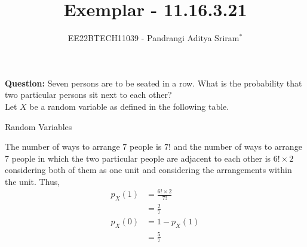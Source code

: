 \documentclass[journal,12pt,twocolumn]{IEEEtran}
\theoremstyle{remark}
\begin{document}

\vspace{3cm}

\title{Exemplar - 11.16.3.21}
\author{EE22BTECH11039 - Pandrangi Aditya Sriram$^{*}$%
}
\maketitle
\newpage
\bigskip

\renewcommand{\thefigure}{\theenumi}
\renewcommand{\thetable}{\theenumi}


\vspace{3cm}
\textbf{Question:} Seven persons are to be seated in a row. What is the probability that two particular persons sit next to each other?\\

\solution
Let $X$ be a random variable as defined in the following table. 
\begin{table}[!ht]
    \centering
    
    \caption{Random Variables}
    \label{table:11_16_3_21}
\end{table}
The number of ways to arrange 7 people is $7!$ and the number of ways to arrange 7 people in which the two particular people are adjacent to each other is $6! \times 2$ considering both of them as one unit and considering the arrangements within the unit. Thus,
\begin{align}
    p_X(1) &= \frac{6! \times 2}{7!}\\
    &= \frac{2}{7}\\
    p_X(0) &= 1- p_X(1)\\
    &= \frac{5}{7}
\end{align}
\end{document}
